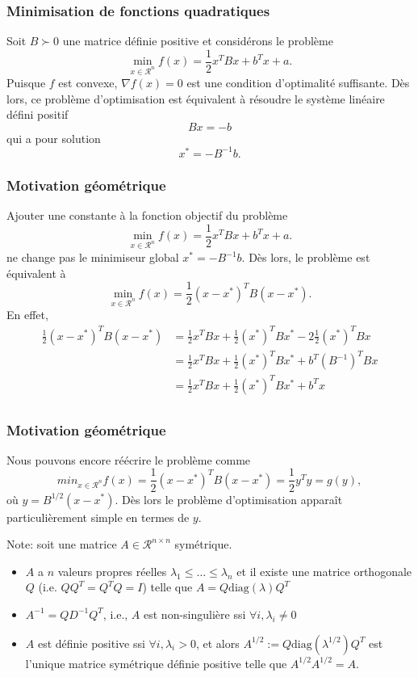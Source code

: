 \documentclass[usepdftitle=false]{beamer}
\def\cR{\mathcal{R}}
\begin{document}
\begin{frame}
\frametitle{Minimisation de fonctions quadratiques}

Soit $B \succ 0$ une matrice définie positive et considérons le problème
$$
\min_{x \in \cR^n} f(x) = \frac{1}{2}x^TBx + b^Tx + a.
$$
Puisque $f$ est convexe, $\nabla f(x) = 0$ est une condition d'optimalité suffisante.
Dès lors, ce problème d'optimisation est équivalent à résoudre le système linéaire défini positif
$$
Bx = -b
$$
qui a pour solution
$$
x^* = - B^{-1}b.
$$

\end{frame}

\begin{frame}
\frametitle{Motivation géométrique}

Ajouter une constante à la fonction objectif du problème
$$
\min_{x \in \cR^n} f(x) = \frac{1}{2}x^TBx + b^Tx + a.
$$
ne change pas le minimiseur global $x^* = - B^{-1}b$.
Dès lors, le problème est équivalent à
$$
\min_{x \in \cR^n} f(x) = \frac{1}{2}(x-x^*)^TB(x-x^*).
$$
En effet,
\begin{align*}
\frac{1}{2}(x-x^*)^TB(x-x^*) &= \frac{1}{2}x^T B x + \frac{1}{2}(x^*)^T B x^* -2\frac{1}{2} (x^*)^T B x \\
& = \frac{1}{2}x^T B x + \frac{1}{2}(x^*)^T B x^* + b^T (B^{-1})^T B x \\
& = \frac{1}{2}x^T B x + \frac{1}{2}(x^*)^T B x^* + b^T x \\
\end{align*}

\end{frame}

\begin{frame}
\frametitle{Motivation géométrique}

Nous pouvons encore réécrire le problème comme
$$
min_{x \in \cR^n} f(x) = \frac{1}{2}(x - x^*)^T B (x - x^*) = \frac{1}{2}y^T y = g(y),
$$
où $y = B^{1/2} (x - x^*)$.
Dès lors le problème d'optimisation apparaît particulièrement simple en termes de $y$.

\mbox{}

Note: soit une matrice $A \in \cR^{n \times n}$ symétrique.
\begin{itemize}
\item
$A$ a $n$ valeurs propres réelles $\lambda_1 \leq \ldots \leq \lambda_n$ et il existe une matrice orthogonale $Q$ (i.e. $QQ^T = Q^TQ = I$) telle que $A = Q \mbox{diag}(\lambda) Q^T$
\item
$A^{-1} = Q D^{-1} Q^T$, i.e., $A$ est non-singulière ssi $\forall i, \lambda_i \ne 0$
\item
$A$ est définie positive ssi $\forall i, \lambda_i > 0$, et alors
$
A^{1/2} := Q \mbox{diag}(\lambda^{1/2}) Q^T
$
est l'unique matrice symétrique définie positive telle que $A^{1/2}A^{1/2} = A$.
\end{itemize}

\end{frame}
\end{document}
